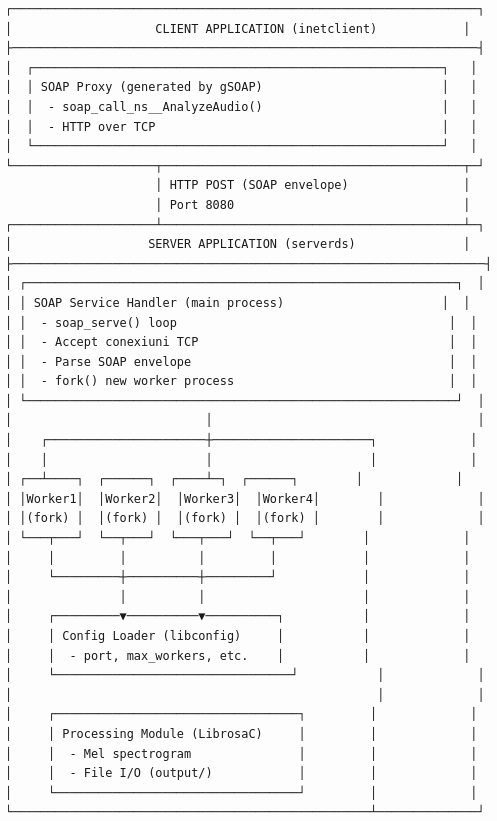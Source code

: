 \documentclass[12pt,a4paper,twoside]{article}
\begin{document}
\begin{verbatim}
┌─────────────────────────────────────────────────────────────────┐
│                    CLIENT APPLICATION (inetclient)            │
├─────────────────────────────────────────────────────────────────┤
│  ┌─────────────────────────────────────────────────────────┐   │
│  │ SOAP Proxy (generated by gSOAP)                         │   │
│  │  - soap_call_ns__AnalyzeAudio()                         │   │
│  │  - HTTP over TCP                                        │   │
│  └─────────────────────────────────────────────────────────┘   │
└────────────────────┬──────────────────────────────────────────┬─┘
                     │ HTTP POST (SOAP envelope)                │ 
                     │ Port 8080                                │
┌────────────────────┴──────────────────────────────────────────┴─┐
│                   SERVER APPLICATION (serverds)               │
├──────────────────────────────────────────────────────────────────┤
│ ┌────────────────────────────────────────────────────────────┐  │
│ │ SOAP Service Handler (main process)                      │  │
│ │  - soap_serve() loop                                      │  │
│ │  - Accept conexiuni TCP                                   │  │
│ │  - Parse SOAP envelope                                    │  │
│ │  - fork() new worker process                              │  │
│ └────────────────────────────────────────────────────────────┘  │
│                           │                                     │
│    ┌──────────────────────┼──────────────────────┐             │
│    │                      │                      │             │
│ ┌──┴────┐  ┌──────┐  ┌────┴─┐  ┌──────┐        │             │
│ │Worker1│  │Worker2│  │Worker3│  │Worker4│        │             │
│ │(fork) │  │(fork) │  │(fork) │  │(fork) │        │             │
│ └───┬───┘  └──┬───┘  └───┬───┘  └──┬───┘        │             │
│     │         │          │         │            │             │
│     └─────────┼──────────┼─────────┘            │             │
│               │          │                      │             │
│     ┌─────────▼──────────▼──────────┐           │             │
│     │ Config Loader (libconfig)     │           │             │
│     │  - port, max_workers, etc.    │           │             │
│     └─────────────────────────────────┘           │             │
│                                                   │             │
│     ┌──────────────────────────────────┐         │             │
│     │ Processing Module (LibrosaC)     │         │             │
│     │  - Mel spectrogram               │         │             │
│     │  - File I/O (output/)            │         │             │
│     └──────────────────────────────────┘         │             │
└──────────────────────────────────────────────────┴──────────────┘
\end{verbatim}
\end{document}
